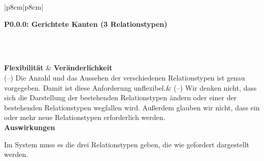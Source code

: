 \documentclass[enabledeprecatedfontcommands,fontsize=11pt,paper=a4,twoside]{scrartcl}
\newcounter{one}
\newcounter{two}[one]
\newcounter{three}[two]
\newcommand{\tone}{0\theone}
\newcommand{\ttwo}{0\thetwo}
\newcommand{\three}{\stepcounter{three}0\thethree}
\begin{document}
\begin{tabular} {|p{8cm}|p{8cm}|}
	\hline
	 {\parbox{16cm}{\textbf{\hypertarget{q}{P\tone.\ttwo.\three}: Gerichtete Kanten (3 Relationstypen)}} } \\ \hline\hline 
	\rule{0pt}{10ex}\\ [7ex] \hline
	\textbf{Flexibilität}  & \textbf{Veränderlichkeit} \\
	(–) Die Anzahl und das Aussehen der verschiedenen Relationstypen ist genau vorgegeben. Damit ist diese Anforderung unflexibel.&
	(–) Wir denken nicht, dass sich die Darstellung der bestehenden Relationstypen ändern oder einer der bestehenden Relationstypen wegfallen wird. Außerdem glauben wir nicht, dass ein oder mehr neue Relationstypen erforderlich werden. \\
	\hline
	 {\textbf{Auswirkungen}} \\
	 {\parbox{16cm}{Im System muss es die drei Relationstypen geben, die wie gefordert dargestellt werden.} }\\ \hline
\end{tabular}
\newpage
\end{document}
